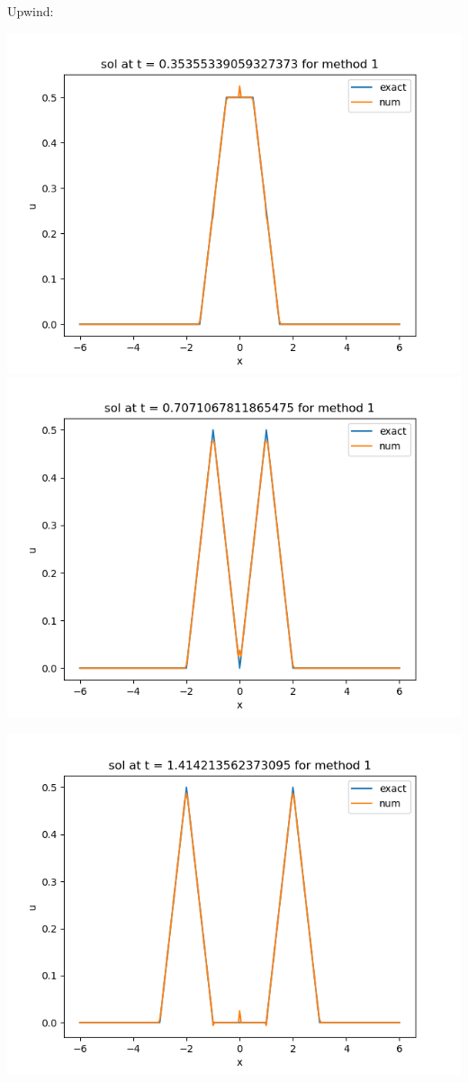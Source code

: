 \documentclass{article}
\begin{document}
\begin{enumerate}[label=(\alph*)]
Upwind:
\begin{center}
	\includegraphics[scale=.3]{hw11 sol n = 10 method 1}
	\includegraphics[scale=.3]{hw11 sol n = 20 method 1}
\end{center}
\begin{center}
	\includegraphics[scale=.3]{hw11 sol n = 40 method 1}

\end{center}
\end{enumerate}
\end{document}
